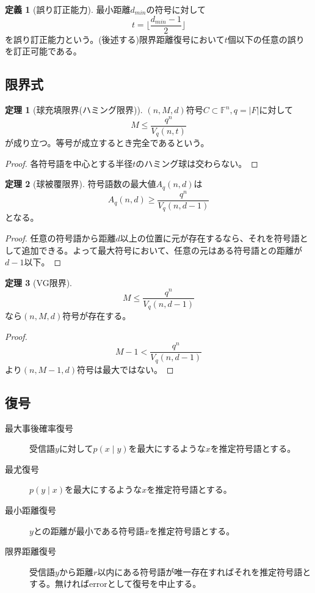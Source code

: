 \documentclass{jsarticle}
\newcommand{\F}{\mathbb{F}}
\renewcommand{\(}{\left(}
\renewcommand{\)}{\right)}
\newcommand{\floor}[1]{\lfloor #1 \rfloor}
\theoremstyle{definition}
\newtheorem{dfn}{定義}
\newtheorem{thm}{定理}
\begin{document}
\begin{dfn}[誤り訂正能力]
    最小距離$d_{min}$の符号に対して
        \[t = \floor{\frac{d_{min} - 1}{2}}\]
    を誤り訂正能力という。(後述する)限界距離復号において$t$個以下の任意の誤りを訂正可能である。
\end{dfn}

\subsection{限界式}

\begin{thm}[球充填限界(ハミング限界)]
    $(n, M, d)$符号$C \subset \F^n, q = |F|$に対して
        \[M \leq \frac{q^n}{V_q(n, t)}\]
    が成り立つ。等号が成立するとき完全であるという。
\end{thm}
\begin{proof}
    各符号語を中心とする半径$t$のハミング球は交わらない。
\end{proof}

\begin{thm}[球被覆限界]
    符号語数の最大値$A_q(n, d)$は
        \[A_q(n, d) \geq \frac{q^n}{V_q(n, d-1)}\]
    となる。
\end{thm}
\begin{proof}
    任意の符号語から距離$d$以上の位置に元が存在するなら、それを符号語として追加できる。よって最大符号において、任意の元はある符号語との距離が$d-1$以下。
\end{proof}

\begin{thm}[VG限界]
        \[M \leq \frac{q^n}{V_q(n, d-1)}\]
    なら$(n, M, d)$符号が存在する。
\end{thm}
\begin{proof}
        \[M - 1 < \frac{q^n}{V_q(n, d-1)}\]
    より$(n, M-1, d)$符号は最大ではない。
\end{proof}

\subsection{復号}

\begin{description}
    \item[最大事後確率復号] 受信語$y$に対して$p(x \mid y)$を最大にするような$x$を推定符号語とする。
    \item[最尤復号] $p(y \mid x)$を最大にするような$x$を推定符号語とする。
    \item[最小距離復号] $y$との距離が最小である符号語$x$を推定符号語とする。
    \item[限界距離復号] 受信語$y$から距離$r$以内にある符号語が唯一存在すればそれを推定符号語とする。無ければerrorとして復号を中止する。
\end{description}
\end{document}
